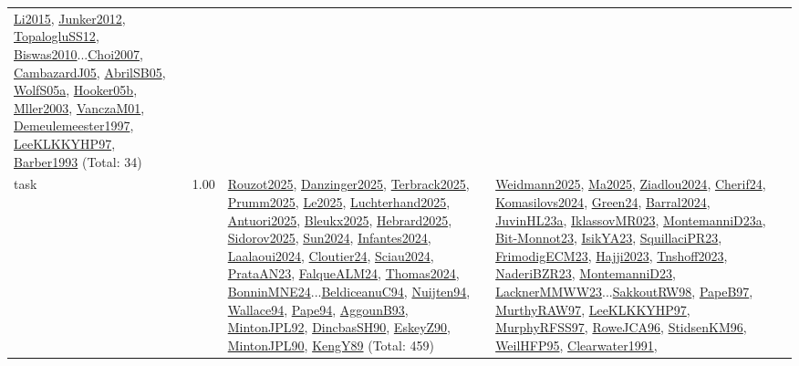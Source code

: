 {\begin{longtable}{p{3cm}r>{\raggedright\arraybackslash}p{6cm}>{\raggedright\arraybackslash}p{6cm}>{\raggedright\arraybackslash}p{8cm}}
\hyperref[detail:Li2015]{Li2015}, \hyperref[detail:Junker2012]{Junker2012}, \hyperref[detail:TopalogluSS12]{TopalogluSS12}, \hyperref[detail:Biswas2010]{Biswas2010}...\hyperref[detail:Choi2007]{Choi2007}, \hyperref[detail:CambazardJ05]{CambazardJ05}, \hyperref[detail:AbrilSB05]{AbrilSB05}, \hyperref[detail:WolfS05a]{WolfS05a}, \hyperref[detail:Hooker05b]{Hooker05b}, \hyperref[detail:Mller2003]{Mller2003}, \hyperref[detail:VanczaM01]{VanczaM01}, \hyperref[detail:Demeulemeester1997]{Demeulemeester1997}, \hyperref[detail:LeeKLKKYHP97]{LeeKLKKYHP97}, \hyperref[detail:Barber1993]{Barber1993} (Total: 34)\\
\index{task}\index{Scheduling!task}task &  1.00 & \hyperref[detail:Rouzot2025]{Rouzot2025}, \hyperref[detail:Danzinger2025]{Danzinger2025}, \hyperref[detail:Terbrack2025]{Terbrack2025}, \hyperref[detail:Prumm2025]{Prumm2025}, \hyperref[detail:Le2025]{Le2025}, \hyperref[detail:Luchterhand2025]{Luchterhand2025}, \hyperref[detail:Antuori2025]{Antuori2025}, \hyperref[detail:Bleukx2025]{Bleukx2025}, \hyperref[detail:Hebrard2025]{Hebrard2025}, \hyperref[detail:Sidorov2025]{Sidorov2025}, \hyperref[detail:Sun2024]{Sun2024}, \hyperref[detail:Infantes2024]{Infantes2024}, \hyperref[detail:Laalaoui2024]{Laalaoui2024}, \hyperref[detail:Cloutier24]{Cloutier24}, \hyperref[detail:Sciau2024]{Sciau2024}, \hyperref[detail:PrataAN23]{PrataAN23}, \hyperref[detail:FalqueALM24]{FalqueALM24}, \hyperref[detail:Thomas2024]{Thomas2024}, \hyperref[detail:BonninMNE24]{BonninMNE24}...\hyperref[detail:BeldiceanuC94]{BeldiceanuC94}, \hyperref[detail:Nuijten94]{Nuijten94}, \hyperref[detail:Wallace94]{Wallace94}, \hyperref[detail:Pape94]{Pape94}, \hyperref[detail:AggounB93]{AggounB93}, \hyperref[detail:MintonJPL92]{MintonJPL92}, \hyperref[detail:DincbasSH90]{DincbasSH90}, \hyperref[detail:EskeyZ90]{EskeyZ90}, \hyperref[detail:MintonJPL90]{MintonJPL90}, \hyperref[detail:KengY89]{KengY89} (Total: 459) & \hyperref[detail:Weidmann2025]{Weidmann2025}, \hyperref[detail:Ma2025]{Ma2025}, \hyperref[detail:Ziadlou2024]{Ziadlou2024}, \hyperref[detail:Cherif24]{Cherif24}, \hyperref[detail:Komasilovs2024]{Komasilovs2024}, \hyperref[detail:Green24]{Green24}, \hyperref[detail:Barral2024]{Barral2024}, \hyperref[detail:JuvinHL23a]{JuvinHL23a}, \hyperref[detail:IklassovMR023]{IklassovMR023}, \hyperref[detail:MontemanniD23a]{MontemanniD23a}, \hyperref[detail:Bit-Monnot23]{Bit-Monnot23}, \hyperref[detail:IsikYA23]{IsikYA23}, \hyperref[detail:SquillaciPR23]{SquillaciPR23}, \hyperref[detail:FrimodigECM23]{FrimodigECM23}, \hyperref[detail:Hajji2023]{Hajji2023}, \hyperref[detail:Tnshoff2023]{Tnshoff2023}, \hyperref[detail:NaderiBZR23]{NaderiBZR23}, \hyperref[detail:MontemanniD23]{MontemanniD23}, \hyperref[detail:LacknerMMWW23]{LacknerMMWW23}...\hyperref[detail:SakkoutRW98]{SakkoutRW98}, \hyperref[detail:PapeB97]{PapeB97}, \hyperref[detail:MurthyRAW97]{MurthyRAW97}, \hyperref[detail:LeeKLKKYHP97]{LeeKLKKYHP97}, \hyperref[detail:MurphyRFSS97]{MurphyRFSS97}, \hyperref[detail:RoweJCA96]{RoweJCA96}, \hyperref[detail:StidsenKM96]{StidsenKM96}, \hyperref[detail:WeilHFP95]{WeilHFP95}, \hyperref[detail:Clearwater1991]{Clearwater1991}, 
\end{longtable}}

